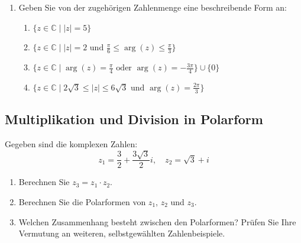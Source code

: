 \begin{enumerate}
\begin{multicols}{2}
\begin{enumerate}
\begin{center}
\begin{tikzpicture}[scale = 0.55, even odd rule]

                \end{tikzpicture}
            \end{center}
            
        \end{enumerate}
        \end{multicols}

    
    \item Geben Sie von der zugehörigen Zahlenmenge eine beschreibende Form an:
    \begin{enumerate}
        \item[(a)] $\{z \in \mathbb{C} \mid |z| = 5 \}$
        \item[(b)] $\{z \in \mathbb{C} \mid |z| = 2 \text{ und } \frac{\pi}{6} \le \arg(z) \le \frac{\pi}{3}  \}$
        \item[(c)] $\{z \in \mathbb{C} \mid \arg(z) = \frac{\pi}{4} \text{ oder } \arg(z) = -\frac{3\pi}{4}\} \cup \{0\}$
        \item[(d)] $\{z \in \mathbb{C} \mid  2\sqrt{3}\le |z| \le 6\sqrt{3} \text{ und } \arg(z) = \frac{2\pi}{3} \}$
    \end{enumerate}
\end{enumerate}





























\clearpage
\subsection{Multiplikation und Division in Polarform}
\begin{LA}{}{}
    Gegeben sind die komplexen Zahlen:
\[
z_1 = \frac{3}{2} + \frac{3\sqrt{3}}{2} i, \quad z_2 = \sqrt{3} + i
\]

\begin{enumerate}
    \item Berechnen Sie \( z_3 = z_1 \cdot z_2 \).
    \item Berechnen Sie die Polarformen von \( z_1 \), \( z_2 \) und \( z_3 \).
    \item Welchen Zusammenhang besteht zwischen den Polarformen? Prüfen Sie Ihre Vermutung an weiteren, selbstgewählten Zahlenbeispiele.
\end{enumerate}
\vfill
\end{LA}

